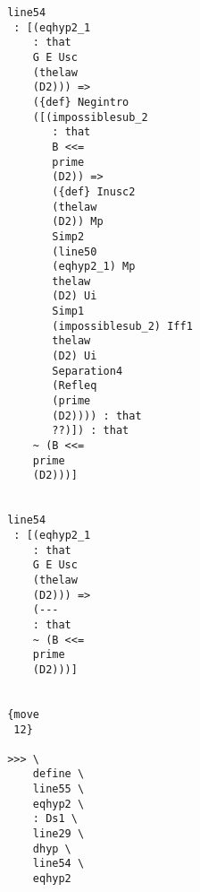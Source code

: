 \documentclass[12pt]{article}
\begin{document}
\begin{verbatim}
                                       line54 
                                        : [(eqhyp2_1 
                                           : that 
                                           G E Usc 
                                           (thelaw 
                                           (D2))) => 
                                           ({def} Negintro 
                                           ([(impossiblesub_2 
                                              : that 
                                              B <<= 
                                              prime 
                                              (D2)) => 
                                              ({def} Inusc2 
                                              (thelaw 
                                              (D2)) Mp 
                                              Simp2 
                                              (line50 
                                              (eqhyp2_1) Mp 
                                              thelaw 
                                              (D2) Ui 
                                              Simp1 
                                              (impossiblesub_2) Iff1 
                                              thelaw 
                                              (D2) Ui 
                                              Separation4 
                                              (Refleq 
                                              (prime 
                                              (D2)))) : that 
                                              ??)]) : that 
                                           ~ (B <<= 
                                           prime 
                                           (D2)))]


                                       line54 
                                        : [(eqhyp2_1 
                                           : that 
                                           G E Usc 
                                           (thelaw 
                                           (D2))) => 
                                           (--- 
                                           : that 
                                           ~ (B <<= 
                                           prime 
                                           (D2)))]


                                       {move 
                                        12}

                                       >>> \
                                           define \
                                           line55 \
                                           eqhyp2 \
                                           : Ds1 \
                                           line29 \
                                           dhyp \
                                           line54 \
                                           eqhyp2



\end{verbatim}
\end{document}
